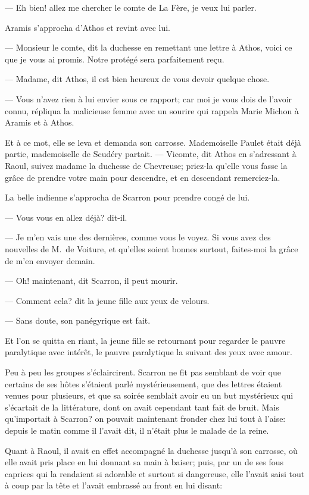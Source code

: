 — Eh bien! allez me chercher le comte de La Fère, je veux lui parler.

Aramis s'approcha d'Athos et revint avec lui.

— Monsieur le comte, dit la duchesse en remettant une lettre à Athos, voici ce que je vous ai promis. Notre protégé sera parfaitement reçu.

— Madame, dit Athos, il est bien heureux de vous devoir quelque chose.

— Vous n'avez rien à lui envier sous ce rapport; car moi je vous dois de l'avoir connu, répliqua la malicieuse femme avec un sourire qui rappela Marie Michon à Aramis et à Athos.

Et à ce mot, elle se leva et demanda son carrosse. Mademoiselle Paulet était déjà partie, mademoiselle de Scudéry partait.
— Vicomte, dit Athos en s'adressant à Raoul, suivez madame la duchesse de Chevreuse; priez-la qu'elle vous fasse la grâce de prendre votre main pour descendre, et en descendant remerciez-la.

La belle indienne s'approcha de Scarron pour prendre congé de lui.

— Vous vous en allez déjà? dit-il.

— Je m'en vais une des dernières, comme vous le voyez. Si vous avez des nouvelles de M.~de Voiture, et qu'elles soient bonnes surtout, faites-moi la grâce de m'en envoyer demain.

— Oh! maintenant, dit Scarron, il peut mourir.

— Comment cela? dit la jeune fille aux yeux de velours.

— Sans doute, son panégyrique est fait.

Et l'on se quitta en riant, la jeune fille se retournant pour regarder le pauvre paralytique avec intérêt, le pauvre paralytique la suivant des yeux avec amour.

Peu à peu les groupes s'éclaircirent. Scarron ne fit pas semblant de voir que certains de ses hôtes s'étaient parlé mystérieusement, que des lettres étaient venues pour plusieurs, et que sa soirée semblait avoir eu un but mystérieux qui s'écartait de la littérature, dont on avait cependant tant fait de bruit. Mais qu'importait à Scarron? on pouvait maintenant fronder chez lui tout à l'aise: depuis le matin comme il l'avait dit, il n'était plus le malade de la reine.

Quant à Raoul, il avait en effet accompagné la duchesse jusqu'à son carrosse, où elle avait pris place en lui donnant sa main à baiser; puis, par un de ses fous caprices qui la rendaient si adorable et surtout si dangereuse, elle l'avait saisi tout à coup par la tête et l'avait embrassé au front en lui disant:

